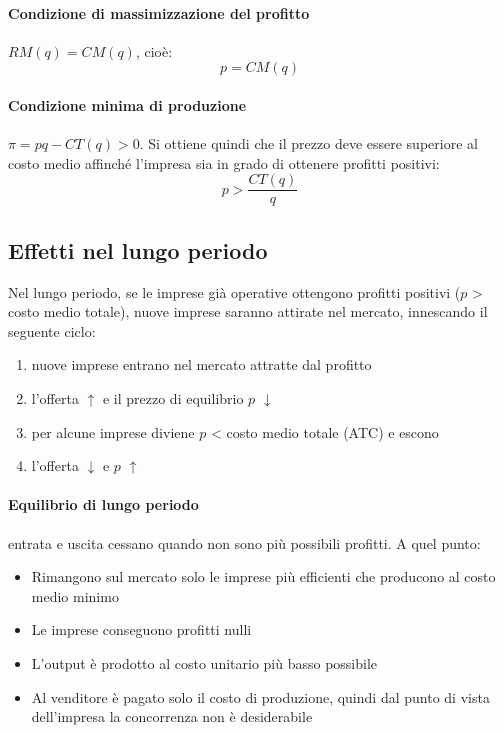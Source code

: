 \paragraph{Condizione di massimizzazione del profitto} $RM(q) = CM(q)$, cioè:
\[
p = CM(q)
\]

\paragraph{Condizione minima di produzione} $\pi = pq - CT(q) > 0$. Si ottiene quindi che il prezzo deve essere superiore al costo medio affinché l’impresa sia in grado
di ottenere profitti positivi:
\[
p > \frac{CT(q)}{q}
\]

\subsection{Effetti nel lungo periodo}
Nel lungo periodo, se le imprese già operative ottengono profitti positivi ($p$ > costo medio totale), nuove
imprese saranno attirate nel mercato, innescando il seguente ciclo:
\begin{enumerate}
	\item nuove imprese entrano nel mercato attratte dal profitto
	\item l’offerta $\uparrow$­ e il prezzo di equilibrio $p$ $\downarrow$
	\item per alcune imprese diviene $p$ < costo medio totale (ATC)
e escono
	\item l’offerta $\downarrow$ e $p$ $\uparrow$ 
\end{enumerate}

\paragraph{Equilibrio di lungo periodo} entrata e uscita cessano quando non sono più possibili profitti. A quel punto:
\begin{itemize}
	\item Rimangono sul mercato solo le imprese più efficienti che producono al costo medio minimo
	\item Le imprese conseguono profitti nulli
	\item L’output è prodotto al costo unitario più basso possibile
	\item Al venditore è pagato solo il costo di produzione, quindi dal punto di vista dell’impresa la concorrenza
	non è desiderabile
\end{itemize}